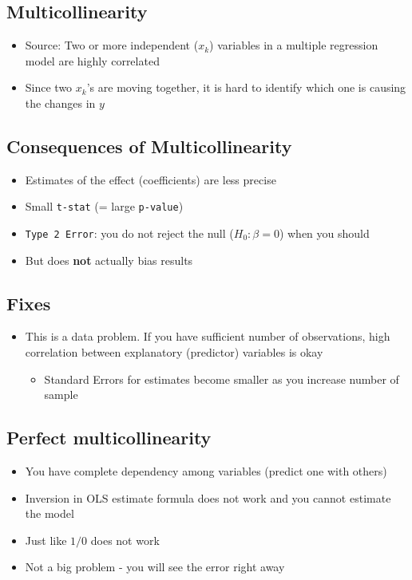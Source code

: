 \documentclass[10pt,article]{article}
\begin{document}
\subsection{Multicollinearity}
\label{sec:org2fdc4c6}

\begin{itemize}
\item Source: Two or more independent (\(x_k\)) variables in a multiple
regression model are highly correlated

\item Since two \(x_k\)'s are moving together, it is hard to identify
which one is causing the changes in \(y\)
\end{itemize}

\subsection{Consequences of Multicollinearity}
\label{sec:orgeaeace7}
\begin{itemize}
\item Estimates of the effect (coefficients) are less precise
\item Small \texttt{t-stat} (= large \texttt{p-value})
\item \texttt{Type 2 Error}: you do not reject the null (\(H_0: \beta=0\)) when you
should
\item But does \textbf{not} actually bias results
\end{itemize}
\subsection{Fixes}
\label{sec:org6c3ad24}
\begin{itemize}
\item This is a data problem. If you have sufficient number of observations, high
correlation between explanatory (predictor) variables is okay

\begin{itemize}
\item Standard Errors for estimates become smaller as you increase number of
sample
\end{itemize}
\end{itemize}
\subsection{Perfect multicollinearity}
\label{sec:orgb9ed508}
\begin{itemize}
\item You have complete dependency among variables (predict one with others)
\item Inversion in OLS estimate formula does not work and you cannot estimate the
model
\item Just like \(1/0\) does not work
\item Not a big problem - you will see the error right away
\end{itemize}
\end{document}
